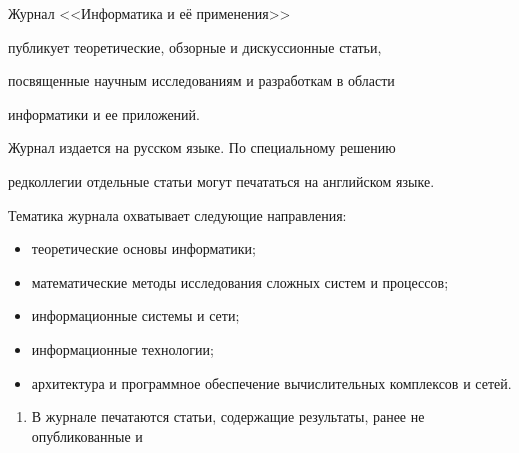 { %





Журнал <<Информатика и её применения>>


публикует теоретические, обзорные и дискуссионные статьи,


посвященные научным исследованиям и разработкам в области


информатики и ее приложений.





Журнал издается на русском языке. По специальному решению


редколлегии отдельные статьи могут печататься на английском языке.





Тематика журнала охватывает следующие направления:


\begin{itemize}


\item теоретические основы информатики;\\[-15pt]


      \item


математические методы исследования сложных систем и процессов;\\[-15pt]


           \item


информационные системы и сети;\\[-15pt]


                \item


информационные технологии;\\[-15pt]


                     \item


архитектура и программное обеспечение вычислительных комплексов и сетей.\\[-15pt]


\end{itemize}








\noindent


\begin{enumerate}[1.]


\item В журнале печатаются статьи, содержащие результаты, ранее не опубликованные и



\end{enumerate}}
